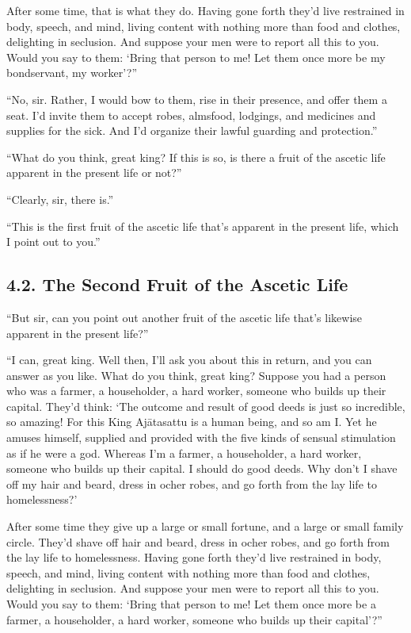 \documentclass[12pt,openany]{book}%
\begin{document}
After some time, that is what they do. Having gone forth they’d live restrained in body, speech, and mind, living content with nothing more than food and clothes, delighting in seclusion. And suppose your men were to report all this to you. Would you say to them: ‘Bring that person to me! Let them once more be my bondservant, my worker’?” 

“No, sir. Rather, I would bow to them, rise in their presence, and offer them a seat. I’d invite them to accept robes, almsfood, lodgings, and medicines and supplies for the sick. And I’d organize their lawful guarding and protection.” 

“What do you think, great king? If this is so, is there a fruit of the ascetic life apparent in the present life or not?” 

“Clearly, sir, there is.” 

“This is the first fruit of the ascetic life that’s apparent in the present life, which I point out to you.” 

\subsection*{4.2. The Second Fruit of the Ascetic Life }

“But sir, can you point out another fruit of the ascetic life that’s likewise apparent in the present life?” 

“I can, great king. Well then, I’ll ask you about this in return, and you can answer as you like. What do you think, great king? Suppose you had a person who was a farmer, a householder, a hard worker, someone who builds up their capital. They’d think: ‘The outcome and result of good deeds is just so incredible, so amazing! For this King \textsanskrit{Ajātasattu} is a human being, and so am I. Yet he amuses himself, supplied and provided with the five kinds of sensual stimulation as if he were a god. Whereas I’m a farmer, a householder, a hard worker, someone who builds up their capital. I should do good deeds. Why don’t I shave off my hair and beard, dress in ocher robes, and go forth from the lay life to homelessness?’ 

After some time they give up a large or small fortune, and a large or small family circle. They’d shave off hair and beard, dress in ocher robes, and go forth from the lay life to homelessness. Having gone forth they’d live restrained in body, speech, and mind, living content with nothing more than food and clothes, delighting in seclusion. And suppose your men were to report all this to you. Would you say to them: ‘Bring that person to me! Let them once more be a farmer, a householder, a hard worker, someone who builds up their capital’?” 
\end{document}
